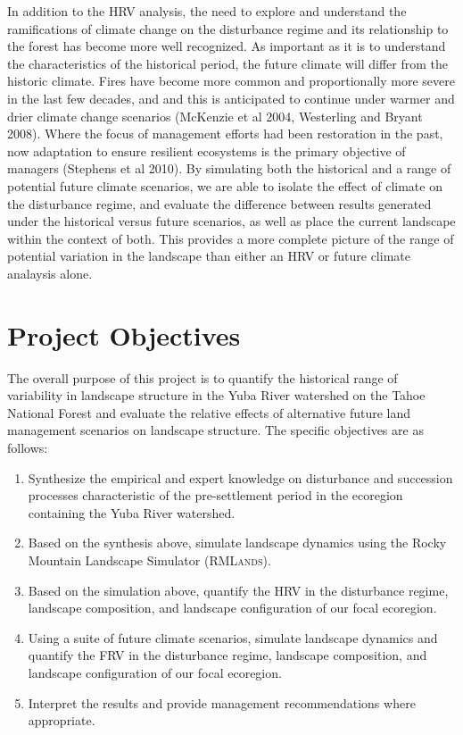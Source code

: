 In addition to the HRV analysis, the need to explore and understand the ramifications of climate change on the disturbance regime and its relationship to the forest has become more well recognized. As important as it is to understand the characteristics of the historical period, the future climate will differ from the historic climate. Fires have become more common and proportionally more severe in the last few decades, and and this is anticipated to continue under warmer and drier climate change scenarios (McKenzie et al 2004, Westerling and Bryant 2008). Where the focus of management efforts had been restoration in the past, now adaptation to ensure resilient ecosystems is the primary objective of managers (Stephens et al 2010). By simulating both the historical and a range of potential future climate scenarios, we are able to isolate the effect of climate on the disturbance regime, and evaluate the difference between results generated under the historical versus future scenarios, as well as place the current landscape within the context of both. This provides a more complete picture of the range of potential variation in the landscape than either an HRV or future climate analaysis alone.


\section{Project Objectives}
The overall purpose of this project is to quantify the historical range of variability in landscape structure in the Yuba River watershed on the Tahoe National Forest and evaluate the relative effects of  alternative future land management scenarios on landscape structure. The specific objectives are as follows:
\begin{enumerate}
	\item Synthesize the empirical and expert knowledge on disturbance and succession processes characteristic of the pre-settlement period in the ecoregion containing the Yuba River watershed.
	\item Based on the synthesis above, simulate landscape dynamics using the Rocky Mountain Landscape Simulator (\textsc{RMLands}).
	\item Based on the simulation above, quantify the HRV in the disturbance regime, landscape composition, and landscape configuration of our focal ecoregion.
	\item Using a suite of future climate scenarios, simulate landscape dynamics and quantify the FRV in the disturbance regime, landscape composition, and landscape configuration of our focal ecoregion.
	\item Interpret the results and provide management recommendations where appropriate.
\end{enumerate}


